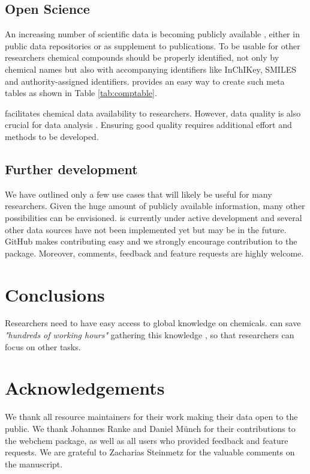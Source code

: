 \documentclass[article, shortnames]{jss}\usepackage[]{graphicx}\usepackage[]{color}
\begin{document}
\subsection[Open Science]{Open Science}
An increasing number of scientific data is becoming publicly available \citep{Gewin_2016, Reichman_Jones_Schildhauer_2011,Boyle_Guha_2011}, either in public data repositories or as supplement to publications.
To be usable for other researchers chemical compounds should be properly identified, not only by chemical names but also with accompanying identifiers like InChIKey, SMILES and authority-assigned identifiers.
 provides an easy way to create such meta tables as shown in Table \ref{tab:comptable}.

 facilitates chemical data availability to researchers.
However, data quality is also crucial for data analysis \citep{Stieger_2014}. 
Ensuring good quality requires additional effort and methods to be developed.


\subsection[Further development]{Further development}
We have outlined only a few use cases that will likely be useful for many researchers.
Given the huge amount of publicly available information, many other possibilities can be envisioned.
 is currently under active development and several other data sources have not been implemented yet but may be in the future.
GitHub makes contributing easy and we strongly encourage contribution to the package.
Moreover, comments, feedback and feature requests are highly welcome.


\section[Conclusions]{Conclusions}
Researchers need to have easy access to global knowledge on chemicals.
 can save \emph{"hundreds of working hours"} gathering this knowledge \citep{Munch_Galizia_2016}, so that researchers can focus on other tasks.


\section*{Acknowledgements}
We thank all resource maintainers for their work making their data open to the public.
We thank Johannes Ranke and Daniel Münch for their contributions to the webchem package, as well as all users who provided feedback and feature requests. 
We are grateful to Zacharias Steinmetz for the valuable comments on the manuscript.



\end{document}
